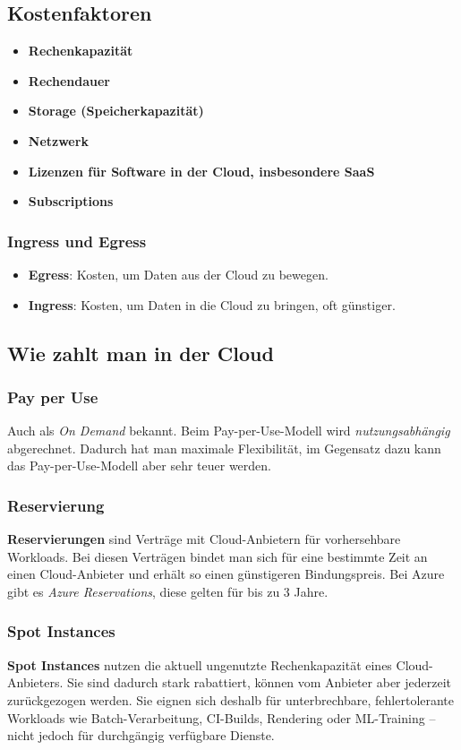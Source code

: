 \subsection{Kostenfaktoren}
\begin{itemize}
    \item \textbf{Rechenkapazität}
    \item \textbf{Rechendauer}
    \item \textbf{Storage (Speicherkapazität)}
    \item \textbf{Netzwerk}
    \item \textbf{Lizenzen für Software in der Cloud, insbesondere SaaS}
    \item \textbf{Subscriptions}
\end{itemize}
\subsubsection{Ingress und Egress}
\begin{itemize}
    \item \textbf{Egress}: Kosten, um Daten aus der Cloud zu bewegen.
    \item \textbf{Ingress}: Kosten, um Daten in die Cloud zu bringen, oft günstiger.
\end{itemize}
\subsection{Wie zahlt man in der Cloud}
\subsubsection{Pay per Use}
Auch als \textit{On Demand} bekannt. Beim Pay-per-Use-Modell wird \emph{nutzungsabhängig} abgerechnet. Dadurch hat man maximale Flexibilität, im Gegensatz dazu kann das Pay-per-Use-Modell aber sehr teuer werden.
\subsubsection{Reservierung}
\textbf{Reservierungen} sind Verträge mit Cloud-Anbietern für vorhersehbare Workloads. Bei diesen Verträgen bindet man sich für eine bestimmte Zeit an einen Cloud-Anbieter und erhält so einen günstigeren Bindungspreis. Bei Azure gibt es \textit{Azure Reservations}, diese gelten für bis zu 3 Jahre.
\subsubsection{Spot Instances}
\textbf{Spot Instances} nutzen die aktuell ungenutzte Rechenkapazität eines Cloud-Anbieters. Sie sind dadurch stark rabattiert, können vom Anbieter aber jederzeit zurückgezogen werden. Sie eignen sich deshalb für unterbrechbare, fehlertolerante Workloads wie Batch-Verarbeitung, CI-Builds, Rendering oder ML-Training -- nicht jedoch für durchgängig verfügbare Dienste.
